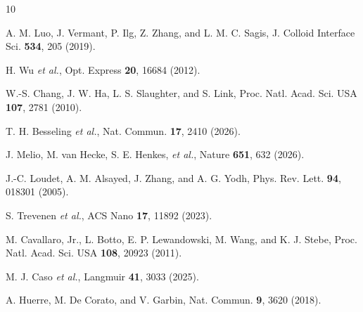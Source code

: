 \documentclass[aps,prl,onecolumn,superscriptaddress,nofootinbib]{revtex4-2}
\begin{document}
\begin{thebibliography}{10}

A. M. Luo, J. Vermant, P. Ilg, Z. Zhang, and L. M. C. Sagis,
J. Colloid Interface Sci. \textbf{534}, 205 (2019).

H. Wu \textit{et al.},
Opt. Express \textbf{20}, 16684 (2012).

W.-S. Chang, J. W. Ha, L. S. Slaughter, and S. Link,
Proc. Natl. Acad. Sci. USA \textbf{107}, 2781 (2010).

T. H. Besseling \textit{et al.},
Nat. Commun. \textbf{17}, 2410 (2026).

J. Melio, M. van Hecke, S. E. Henkes, \textit{et al.},
Nature \textbf{651}, 632 (2026).

J.-C. Loudet, A. M. Alsayed, J. Zhang, and A. G. Yodh,
Phys. Rev. Lett. \textbf{94}, 018301 (2005).

S. Trevenen \textit{et al.},
ACS Nano \textbf{17}, 11892 (2023).

M. Cavallaro, Jr., L. Botto, E. P. Lewandowski, M. Wang, and K. J. Stebe,
Proc. Natl. Acad. Sci. USA \textbf{108}, 20923 (2011).

M. J. Caso \textit{et al.},
Langmuir \textbf{41}, 3033 (2025).

A. Huerre, M. De Corato, and V. Garbin,
Nat. Commun. \textbf{9}, 3620 (2018).

\end{thebibliography}
\end{document}
